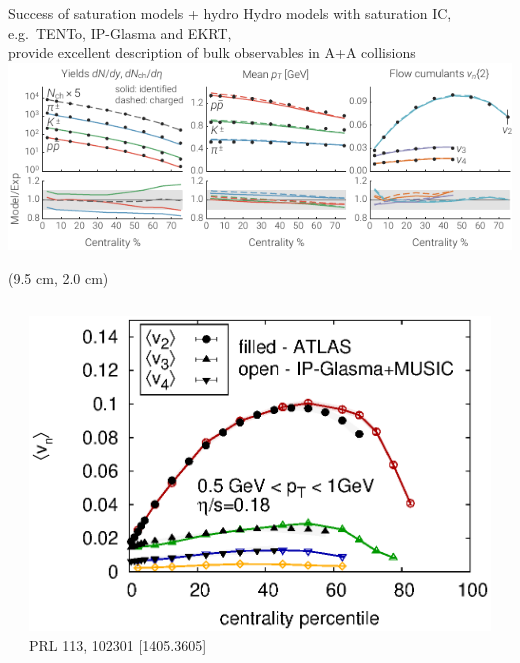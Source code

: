 \documentclass[aspectratio=43]{beamer}
\theoremstyle{definition}
\newcommand{\trento}{T\raisebox{-0.3ex}{R}ENTo}
\begin{document}
\begin{frame}[plain]{Success of saturation models + hydro}
  \centering
  \medskip
  \scriptsize Hydro models with saturation IC, e.g.\ \trento, IP-Glasma and EKRT,\\
  provide excellent description of bulk observables in A+A collisions \\[1ex]
  \includegraphics[width=.8\textwidth]{mode_observables} \\[1ex]
  \begin{textblock*}{0.3\textwidth}(9.5 cm, 2.0 cm)
  \end{textblock*}
  \begin{columns}
    \begin{column}{.075\textwidth}
    \end{column}
    \begin{column}{.45\textwidth}
      \centering
      \includegraphics[width=\columnwidth]{vn_ipglasma.eps} \\
      {\tiny PRL 113, 102301 [1405.3605]}
    \end{column}
    \begin{column}{.4\textwidth}
      \centering

\end{column}
\end{columns}
\end{frame}
\end{document}
